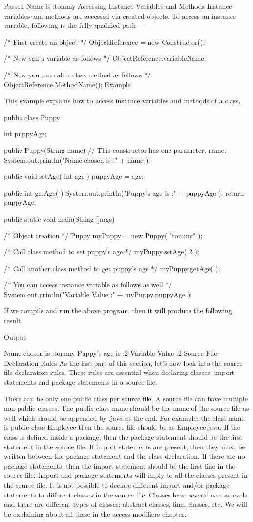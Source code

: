 Passed Name is :tommy
Accessing Instance Variables and Methods
Instance variables and methods are accessed via created objects. To access an instance variable, following is the fully qualified path −

/* First create an object */
ObjectReference = new Constructor();

/* Now call a variable as follows */
ObjectReference.variableName;

/* Now you can call a class method as follows */
ObjectReference.MethodName();
Example

This example explains how to access instance variables and methods of a class.

public class Puppy {
   int puppyAge;

   public Puppy(String name) {
      // This constructor has one parameter, name.
      System.out.println("Name chosen is :" + name );
   }

   public void setAge( int age ) {
      puppyAge = age;
   }

   public int getAge( ) {
      System.out.println("Puppy's age is :" + puppyAge );
      return puppyAge;
   }

   public static void main(String []args) {
      /* Object creation */
      Puppy myPuppy = new Puppy( "tommy" );

      /* Call class method to set puppy's age */
      myPuppy.setAge( 2 );

      /* Call another class method to get puppy's age */
      myPuppy.getAge( );

      /* You can access instance variable as follows as well */
      System.out.println("Variable Value :" + myPuppy.puppyAge );
   }
}
If we compile and run the above program, then it will produce the following result

Output

Name chosen is :tommy
Puppy's age is :2
Variable Value :2
Source File Declaration Rules
As the last part of this section, let's now look into the source file declaration rules. These rules are essential when declaring classes, import statements and package statements in a source file.

There can be only one public class per source file.
A source file can have multiple non-public classes.
The public class name should be the name of the source file as well which should be appended by .java at the end. For example: the class name is public class Employee{} then the source file should be as Employee.java.
If the class is defined inside a package, then the package statement should be the first statement in the source file.
If import statements are present, then they must be written between the package statement and the class declaration. If there are no package statements, then the import statement should be the first line in the source file.
Import and package statements will imply to all the classes present in the source file. It is not possible to declare different import and/or package statements to different classes in the source file.
Classes have several access levels and there are different types of classes; abstract classes, final classes, etc. We will be explaining about all these in the access modifiers chapter.


